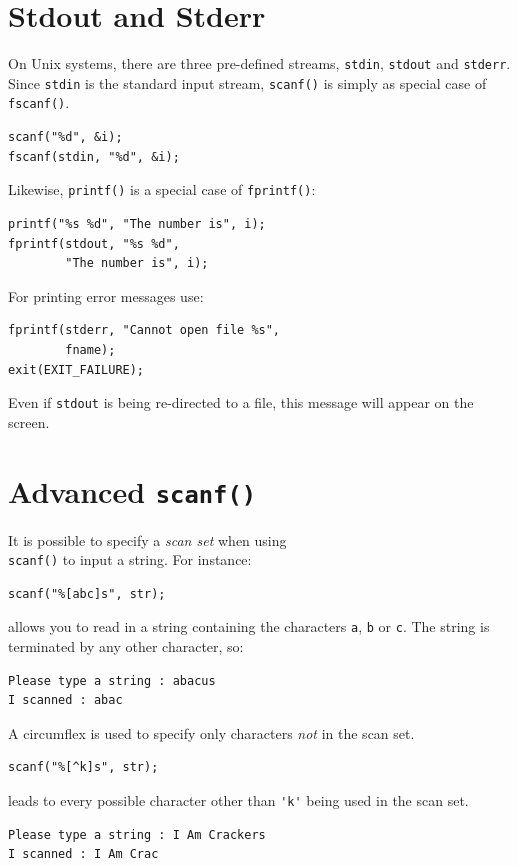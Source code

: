 \documentclass[a4,portraitt]{slides}
\begin{document}
\section*{Stdout and Stderr}
On Unix systems, there are three pre-defined streams,
\verb^stdin^, \verb^stdout^ and \verb^stderr^. Since
\verb^stdin^ is the standard input stream, \verb^scanf()^ is
simply as special case of \verb^fscanf()^.
\begin{verbatim}
scanf("%d", &i);
fscanf(stdin, "%d", &i);
\end{verbatim}
Likewise, \verb^printf()^ is a special case of \verb^fprintf()^:
\begin{verbatim}
printf("%s %d", "The number is", i);
fprintf(stdout, "%s %d",
        "The number is", i);
\end{verbatim}
For printing error messages use:
\begin{verbatim}
fprintf(stderr, "Cannot open file %s",
        fname);
exit(EXIT_FAILURE);
\end{verbatim}
Even if \verb^stdout^ is being re-directed to a file, this
message will appear on the screen.

\newpage
\section*{Advanced {\tt scanf()}}
It is possible to specify a {\it scan set} when using\\
\verb^scanf()^ to input a string. For instance:
\vspace{-0.75em}
\begin{verbatim}
scanf("%[abc]s", str);
\end{verbatim}
\vspace{-0.75em}
allows you to read in a string containing the characters
\verb^a^,
\verb^b^ or
\verb^c^.
The string is terminated by any other character, so:
\vspace{-0.75em}
\begin{verbatim}
Please type a string : abacus
I scanned : abac
\end{verbatim}
\vspace{-0.75em}
A circumflex is used to specify only characters {\it not} in
the scan set.
\vspace{-0.75em}
\begin{verbatim}
scanf("%[^k]s", str);
\end{verbatim}
\vspace{-0.75em}
leads to every possible character other than \verb^'k'^ being
used in the scan set.
\vspace{-0.75em}
\begin{verbatim}
Please type a string : I Am Crackers
I scanned : I Am Crac
\end{verbatim}
\vspace{-0.75em}
\newpage
\end{document}

